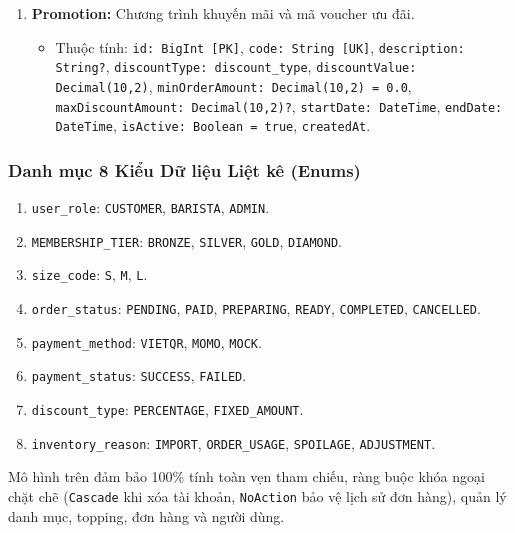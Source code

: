 \documentclass[11pt,a4paper]{article}
\begin{document}
\begin{enumerate}[leftmargin=*,resume]
\begin{itemize}[leftmargin=*,noitemsep]
        \item Mối quan hệ: n-1 với \texttt{Order} (\texttt{onDelete: Cascade}).
    \end{itemize}
    \item \textbf{Promotion:} Chương trình khuyến mãi và mã voucher ưu đãi.
    \begin{itemize}[leftmargin=*,noitemsep]
        \item Thuộc tính: \texttt{id: BigInt [PK]}, \texttt{code: String [UK]}, \texttt{description: String?}, \texttt{discountType: discount\_type}, \texttt{discountValue: Decimal(10,2)}, \texttt{minOrderAmount: Decimal(10,2) = 0.0}, \texttt{maxDiscountAmount: Decimal(10,2)?}, \texttt{startDate: DateTime}, \texttt{endDate: DateTime}, \texttt{isActive: Boolean = true}, \texttt{createdAt}.
    \end{itemize}
\end{enumerate}

\subsubsection{Danh mục 8 Kiểu Dữ liệu Liệt kê (Enums)}
\begin{enumerate}[leftmargin=*]
    \item \texttt{user\_role}: \texttt{CUSTOMER}, \texttt{BARISTA}, \texttt{ADMIN}.
    \item \texttt{MEMBERSHIP\_TIER}: \texttt{BRONZE}, \texttt{SILVER}, \texttt{GOLD}, \texttt{DIAMOND}.
    \item \texttt{size\_code}: \texttt{S}, \texttt{M}, \texttt{L}.
    \item \texttt{order\_status}: \texttt{PENDING}, \texttt{PAID}, \texttt{PREPARING}, \texttt{READY}, \texttt{COMPLETED}, \texttt{CANCELLED}.
    \item \texttt{payment\_method}: \texttt{VIETQR}, \texttt{MOMO}, \texttt{MOCK}.
    \item \texttt{payment\_status}: \texttt{SUCCESS}, \texttt{FAILED}.
    \item \texttt{discount\_type}: \texttt{PERCENTAGE}, \texttt{FIXED\_AMOUNT}.
    \item \texttt{inventory\_reason}: \texttt{IMPORT}, \texttt{ORDER\_USAGE}, \texttt{SPOILAGE}, \texttt{ADJUSTMENT}.
\end{enumerate}

Mô hình trên đảm bảo 100\% tính toàn vẹn tham chiếu, ràng buộc khóa ngoại chặt chẽ (\texttt{Cascade} khi xóa tài khoản, \texttt{NoAction} bảo vệ lịch sử đơn hàng), quản lý danh mục, topping, đơn hàng và người dùng.
\clearpage
\end{document}
